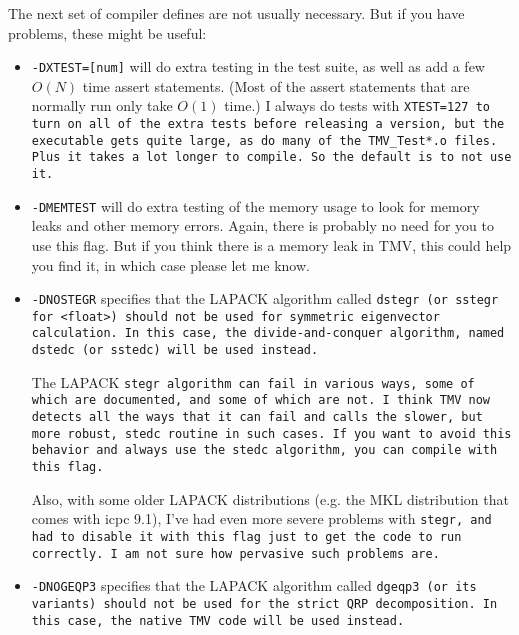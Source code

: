 The next set of compiler defines are not usually necessary.  But
if you have problems, these might be useful:
\begin{itemize}
\item
\texttt{-DXTEST=[num]} will do extra testing in the test suite, as well as add a few $O(N)$
time assert statements.  (Most of the assert statements that are normally run only take
$O(1)$ time.)  I always do tests with \tt{XTEST=127} to turn on all of the extra tests
before releasing a version, but the
executable gets quite large, as do many of the \texttt{TMV\_Test*.o} files.  Plus it takes
a lot longer to compile.  So the default is to not use it.  

\item
\texttt{-DMEMTEST} will do extra testing of the memory usage to look for memory leaks
and other memory errors.  Again, there is probably no need for you to use this
flag.  But if you think there is a memory leak in TMV, this could help you find it, 
in which case please let me know.

\item
\texttt{-DNOSTEGR} specifies that the LAPACK algorithm called
\tt{dstegr} (or \tt{sstegr} for \tt{<float>}) should not be used for symmetric
eigenvector calculation.  In this case, the divide-and-conquer algorithm,
named \tt{dstedc} (or \tt{sstedc}) will be used instead.

The LAPACK \tt{stegr} algorithm can fail in various ways, some of which are 
documented, and some of which are not.  I think TMV now detects all the 
ways that it can fail and calls
the slower, but more robust, \tt{stedc} routine in such cases.
If you want to avoid this behavior and always use the \tt{stedc} algorithm,
you can compile with this flag.

Also, with some older LAPACK distributions (e.g. the MKL distribution that comes with icpc 9.1),
I've had even more severe problems
with \tt{stegr}, and had to disable it with this flag just to get the code to run correctly.
I am not sure how pervasive such problems are.
\item
\texttt{-DNOGEQP3} specifies that the LAPACK algorithm called
\tt{dgeqp3} (or its variants) should not be used for the strict QRP decomposition.
In this case, the native TMV code will be used instead.


\end{itemize}
